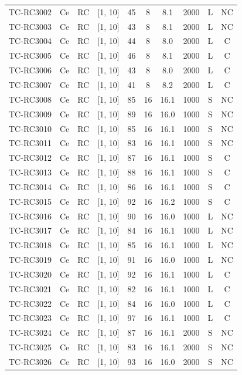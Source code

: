 \begin{longtable}{lccccccccc}
TC-RC3002 & Ce & RC & [1, 10] & 45 & 8 & 8.1 & 2000 & L & NC \\
TC-RC3003 & Ce & RC & [1, 10] & 43 & 8 & 8.1 & 2000 & L & NC \\
TC-RC3004 & Ce & RC & [1, 10] & 44 & 8 & 8.0 & 2000 & L & C \\
TC-RC3005 & Ce & RC & [1, 10] & 46 & 8 & 8.1 & 2000 & L & C \\
TC-RC3006 & Ce & RC & [1, 10] & 43 & 8 & 8.0 & 2000 & L & C \\
TC-RC3007 & Ce & RC & [1, 10] & 41 & 8 & 8.2 & 2000 & L & C \\
TC-RC3008 & Ce & RC & [1, 10] & 85 & 16 & 16.1 & 1000 & S & NC \\
TC-RC3009 & Ce & RC & [1, 10] & 89 & 16 & 16.0 & 1000 & S & NC \\
TC-RC3010 & Ce & RC & [1, 10] & 85 & 16 & 16.1 & 1000 & S & NC \\
TC-RC3011 & Ce & RC & [1, 10] & 83 & 16 & 16.1 & 1000 & S & NC \\
TC-RC3012 & Ce & RC & [1, 10] & 87 & 16 & 16.1 & 1000 & S & C \\
TC-RC3013 & Ce & RC & [1, 10] & 88 & 16 & 16.1 & 1000 & S & C \\
TC-RC3014 & Ce & RC & [1, 10] & 86 & 16 & 16.1 & 1000 & S & C \\
TC-RC3015 & Ce & RC & [1, 10] & 92 & 16 & 16.2 & 1000 & S & C \\
TC-RC3016 & Ce & RC & [1, 10] & 90 & 16 & 16.0 & 1000 & L & NC \\
TC-RC3017 & Ce & RC & [1, 10] & 84 & 16 & 16.1 & 1000 & L & NC \\
TC-RC3018 & Ce & RC & [1, 10] & 85 & 16 & 16.1 & 1000 & L & NC \\
TC-RC3019 & Ce & RC & [1, 10] & 91 & 16 & 16.0 & 1000 & L & NC \\
TC-RC3020 & Ce & RC & [1, 10] & 92 & 16 & 16.1 & 1000 & L & C \\
TC-RC3021 & Ce & RC & [1, 10] & 82 & 16 & 16.1 & 1000 & L & C \\
TC-RC3022 & Ce & RC & [1, 10] & 84 & 16 & 16.0 & 1000 & L & C \\
TC-RC3023 & Ce & RC & [1, 10] & 97 & 16 & 16.1 & 1000 & L & C \\
TC-RC3024 & Ce & RC & [1, 10] & 87 & 16 & 16.1 & 2000 & S & NC \\
TC-RC3025 & Ce & RC & [1, 10] & 83 & 16 & 16.1 & 2000 & S & NC \\
TC-RC3026 & Ce & RC & [1, 10] & 93 & 16 & 16.0 & 2000 & S & NC \\

\end{longtable}
